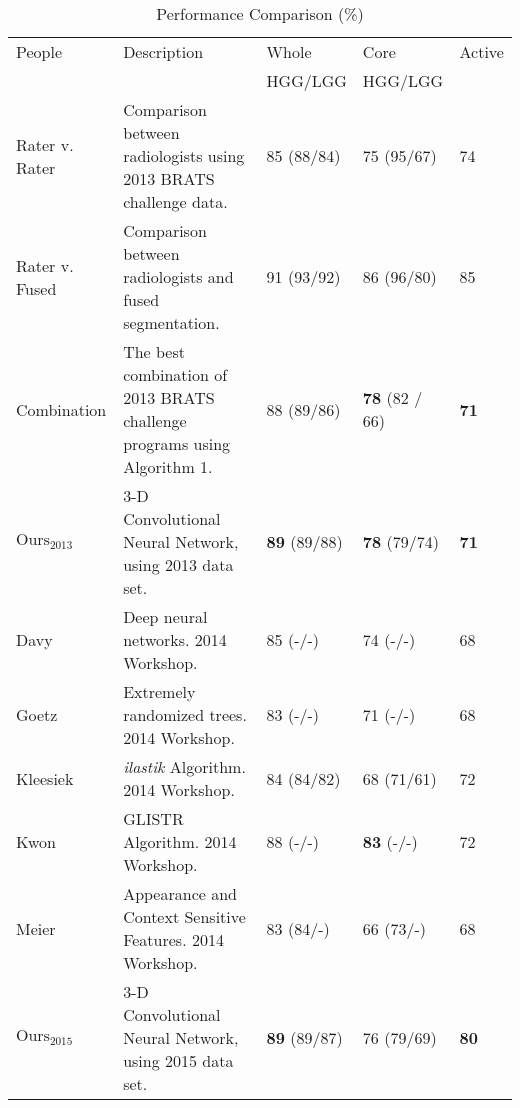 \documentclass{llncs}
\begin{document}
\begin{table}[h]
\caption{Performance Comparison (\%)}\label{table:Comparison}
\begin{center}
\begin{tabular}{L{2cm}|L{5cm}|L{2cm}|L{2cm}|C{1cm}}
\toprule
People&Description&Whole&Core&Active\\
& & \hspace*{\fill} HGG/LGG \normalsize & \hspace*{\fill} HGG/LGG& \\
\midrule
\midrule
Rater v. Rater & Comparison between radiologists using 2013 BRATS challenge data. & 85 \hfill (88/84) & 75 \hfill (95/67) & 74\\
Rater v. Fused & Comparison between radiologists and fused segmentation. & 91 \hfill (93/92) & 86 \hfill (96/80) & 85\\
Combination & The best combination of 2013 BRATS challenge programs using Algorithm 1. & 88 \hfill (89/86) & \textbf{78} \hfill (82 / 66) & \textbf{71} \\
\midrule
$\text{Ours}_{\text{2013}}$ & 3-D Convolutional Neural Network, using 2013 data set. & \textbf{89} \hfill (89/88) & \textbf{78} \hfill (79/74) & \textbf{71}\\
\midrule
\midrule
  Davy & Deep neural networks.  2014 Workshop. & 85 \hfill (-/-) & 74 \hfill (-/-) & 68 \\
Goetz & Extremely randomized trees.  2014 Workshop. & 83 \hfill (-/-) & 71 \hfill (-/-) & 68\\
Kleesiek & \emph{ilastik} Algorithm. 2014 Workshop. & 84 \hfill (84/82) & 68 \hfill (71/61) & 72\\
Kwon & GLISTR Algorithm.  2014 Workshop. & 88 \hfill (-/-) & \textbf{83} \hfill (-/-) & 72\\
Meier & Appearance and Context Sensitive Features.  2014 Workshop.  & 83 \hfill (84/-) & 66 \hfill (73/-) & 68\\
\midrule
$\text{Ours}_{\text{2015}}$ & 3-D Convolutional Neural Network, using 2015 data set. & \textbf{89} \hfill (89/87) & 76 \hfill (79/69) & \textbf{80}\\
\midrule
\midrule
\end{tabular}
\end{center}
\end{table}


\end{document}
